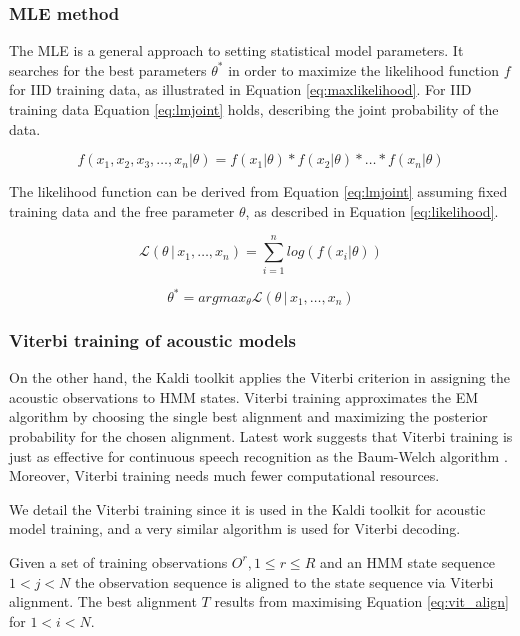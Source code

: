 \subsubsection*{\acl{MLE} method}
\label{sub:mle_method}
The \ac{MLE} is a general approach to setting statistical model parameters. It searches for the best parameters $\theta^*$ in order to maximize the likelihood function $f$ for \ac{IID} training data, as illustrated in Equation \ref{eq:maxlikelihood}. For \ac{IID} training data Equation \ref{eq:lmjoint} holds, describing the joint probability of the data.
 
\begin{equation}\label{eq:lmjoint}
    f(x_1, x_2, x_3, \ldots, x_n | \theta) = f(x_1 | \theta) * f(x_2 | \theta) * \ldots * f(x_n | \theta)
\end{equation}

The likelihood function can be derived from Equation \ref{eq:lmjoint} assuming fixed training data and the free parameter $\theta$, as described in Equation \ref{eq:likelihood}.

\begin{equation}\label{eq:likelihood}
    \mathcal{L}(\theta\,|\,x_1,\ldots,x_n) = \sum_{i=1}^n log(f(x_i|\theta))
\end{equation}

\begin{equation}\label{eq:maxlikelihood}
    \theta^* = argmax_{\theta} \mathcal{L}(\theta\,|\,x_1,\ldots,x_n)
\end{equation}

\subsubsection*{Viterbi training of acoustic models}
On the other hand, the Kaldi toolkit applies the Viterbi criterion in assigning the acoustic observations to \ac{HMM} states. Viterbi training approximates the \ac{EM} algorithm by choosing the single best alignment and maximizing the posterior probability for the chosen alignment. Latest work suggests that Viterbi training is just as effective for continuous speech recognition as the Baum-Welch algorithm \cite{rodriguez2003comparative}. Moreover, Viterbi training needs much fewer computational resources. 

We detail the Viterbi training since it is used in the Kaldi toolkit for acoustic model training, and a very similar algorithm is used for Viterbi decoding.

Given a set of training observations $O^r, 1 \le r \le R$ and an \ac{HMM} state sequence $1<j<N$ the observation sequence is aligned to the state sequence via Viterbi alignment.\cite{buthpitiya2012parallel} The best alignment $T$ results from maximising Equation \ref{eq:vit_align} for $1<i< N$.

